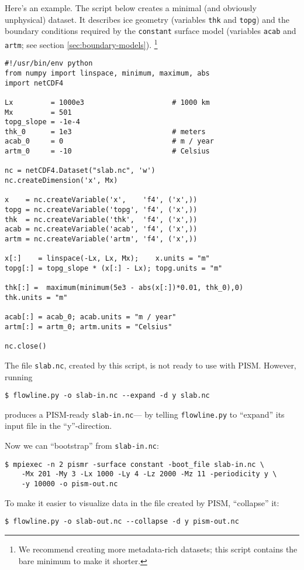 Here's an example. The script below creates a minimal (and obviously
unphysical) dataset. It describes ice geometry (variables \texttt{thk} and
\texttt{topg}) and the boundary conditions required by the \texttt{constant}
surface model (variables \texttt{acab} and \texttt{artm}; see section
\ref{sec:boundary-models}). \footnote{We recommend creating more metadata-rich
  datasets; this script contains the bare minimum to make it shorter.}
\begin{verbatim}
#!/usr/bin/env python
from numpy import linspace, minimum, maximum, abs
import netCDF4

Lx         = 1000e3                     # 1000 km
Mx         = 501
topg_slope = -1e-4
thk_0      = 1e3                        # meters
acab_0     = 0                          # m / year
artm_0     = -10                        # Celsius

nc = netCDF4.Dataset("slab.nc", 'w')
nc.createDimension('x', Mx)

x    = nc.createVariable('x',    'f4', ('x',))
topg = nc.createVariable('topg', 'f4', ('x',))
thk  = nc.createVariable('thk',  'f4', ('x',))
acab = nc.createVariable('acab', 'f4', ('x',))
artm = nc.createVariable('artm', 'f4', ('x',))

x[:]    = linspace(-Lx, Lx, Mx);    x.units = "m"
topg[:] = topg_slope * (x[:] - Lx); topg.units = "m"

thk[:] =  maximum(minimum(5e3 - abs(x[:])*0.01, thk_0),0)
thk.units = "m"

acab[:] = acab_0; acab.units = "m / year"
artm[:] = artm_0; artm.units = "Celsius"

nc.close()
\end{verbatim}

The file \texttt{slab.nc}, created by this script, is not ready to use with
PISM. However, running
\begin{verbatim}
$ flowline.py -o slab-in.nc --expand -d y slab.nc
\end{verbatim} %
produces  a PISM-ready \texttt{slab-in.nc}--- by telling \texttt{flowline.py} to
``expand'' its input file in the ``y''-direction.

Now we can ``bootstrap'' from \texttt{slab-in.nc}:
\begin{verbatim}
$ mpiexec -n 2 pismr -surface constant -boot_file slab-in.nc \
    -Mx 201 -My 3 -Lx 1000 -Ly 4 -Lz 2000 -Mz 11 -periodicity y \
    -y 10000 -o pism-out.nc
\end{verbatim}%

To make it easier to visualize data in the file created by PISM, ``collapse'' it:
\begin{verbatim}
$ flowline.py -o slab-out.nc --collapse -d y pism-out.nc
\end{verbatim}%

